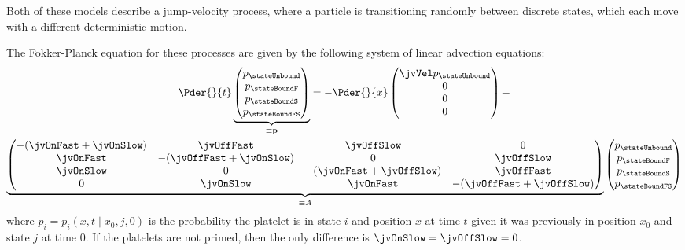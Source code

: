 
Both of these models describe a jump-velocity process, where a
particle is transitioning randomly between discrete states, which each
move with a different deterministic motion.


The Fokker-Planck equation for these processes are given by the
following system of linear advection equations:
\begin{multline}
  \label{eq:fp-system}
  \Pder{}{t}
  \underbrace{
    \begin{pmatrix}
      p_{\stateUnbound} \\  p_\stateBoundF \\ p_\stateBoundS \\
      p_\stateBoundFS
    \end{pmatrix}}_{\equiv \mathbf{p}}
  =
  -\Pder{}{x}
  \begin{pmatrix}
    \jvVel p_{\stateUnbound} \\ 0 \\ 0 \\ 0
  \end{pmatrix}
  + \\
  \underbrace{
    \begin{pmatrix}
      -(\jvOnFast + \jvOnSlow) & \jvOffFast & \jvOffSlow & 0 \\
      \jvOnFast & -(\jvOffFast + \jvOnSlow) & 0 & \jvOffSlow \\
      \jvOnSlow & 0 & -(\jvOnFast + \jvOffSlow) & \jvOffFast \\
      0 & \jvOnSlow & \jvOnFast & -(\jvOffFast + \jvOffSlow)
  \end{pmatrix}}_{\equiv A}
  \begin{pmatrix}
    p_{\stateUnbound} \\ p_\stateBoundF \\ p_\stateBoundS \\
    p_\stateBoundFS
  \end{pmatrix}
\end{multline}
where $p_i = p_i(x, t \mid x_0, j, 0)$ is the probability the platelet
is in state $i$ and position $x$ at time $t$ given it was previously in
position $x_0$ and state $j$ at time $0$. If the platelets are not primed,
then the only difference is $\jvOnSlow = \jvOffSlow = 0$.

